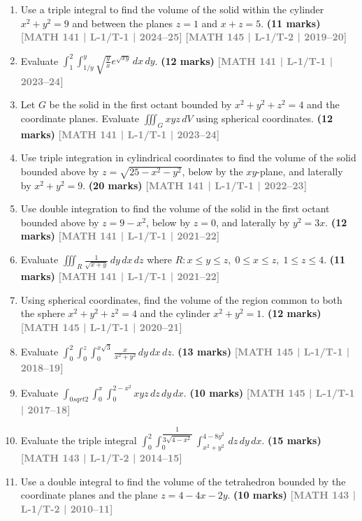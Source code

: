 \documentclass[12pt,a3paper]{article}
\newcommand{\yr}[1]{\hfill\textcolor{gray}{\small\textbf{[#1]}}}
\newcommand{\mk}[1]{\textcolor{orange!70!black}{\small\textbf{(#1 marks)}}}
\begin{document}
\begin{enumerate}

\item Use a triple integral to find the volume of the solid within the cylinder $x^{2}+y^{2}=9$ and between the planes $z=1$ and $x+z=5$. 
\mk{11} \yr{MATH 141 | L-1/T-1 | 2024--25} \yr{MATH 145 | L-1/T-2 | 2019--20}
  
\item Evaluate $\displaystyle\int_{1}^{2}\int_{1/y}^{y}\sqrt{\frac{y}{x}}e^{\sqrt{xy}}\,dx\,dy$.
\mk{12} \yr{MATH 141 | L-1/T-1 | 2023--24}

\item Let $G$ be the solid in the first octant bounded by $x^{2}+y^{2}+z^{2}=4$ and the coordinate planes. Evaluate $\displaystyle\iiint_{G}xyz\,dV$ using spherical coordinates.
\mk{12} \yr{MATH 141 | L-1/T-1 | 2023--24}

\item Use triple integration in cylindrical coordinates to find the volume of the solid bounded above by $z=\sqrt{25-x^{2}-y^{2}}$, below by the $xy$-plane, and laterally by $x^{2}+y^{2}=9$.
\mk{20} \yr{MATH 141 | L-1/T-1 | 2022--23}

\item Use double integration to find the volume of the solid in the first octant bounded above by $z=9-x^{2}$, below by $z=0$, and laterally by $y^{2}=3x$.
\mk{12} \yr{MATH 141 | L-1/T-1 | 2021--22}

\item Evaluate $\displaystyle\iiint_{R}\frac{1}{\sqrt{x+y}}\,dy\,dx\,dz$ where $R: x\le y\le z,\;0\le x\le z,\;1\le z\le 4$.
\mk{11} \yr{MATH 141 | L-1/T-1 | 2021--22}

\item Using spherical coordinates, find the volume of the region common to both the sphere $x^{2}+y^{2}+z^{2}=4$ and the cylinder $x^{2}+y^{2}=1$.
\mk{12} \yr{MATH 145 | L-1/T-1 | 2020--21}

\item Evaluate $\displaystyle\int_{0}^{2}\int_{0}^{z}\int_{0}^{x\sqrt{3}}\frac{x}{x^{2}+y^{2}}\,dy\,dx\,dz$.
\mk{13} \yr{MATH 145 | L-1/T-1 | 2018--19}

\item Evaluate $\displaystyle\int_{0sqrt{2}}\int_{0}^{x}\int_{0}^{2-x^{2}}xyz\,dz\,dy\,dx$.
\mk{10} \yr{MATH 145 | L-1/T-1 | 2017--18}

\item Evaluate the triple integral $\displaystyle\int_{0}^{2}\int_{0}^{\dfrac{1}{3\sqrt{4-x^{2}}}}\int_{x^{2}+y^{2}}^{4-8y^{2}}\,dz\,dy\,dx$.
\mk{15} \yr{MATH 143 | L-1/T-2 | 2014--15}

\item Use a double integral to find the volume of the tetrahedron bounded by the coordinate planes and the plane $z=4-4x-2y$.
\mk{10} \yr{MATH 143 | L-1/T-2 | 2010--11}

\end{enumerate}
\end{document}
